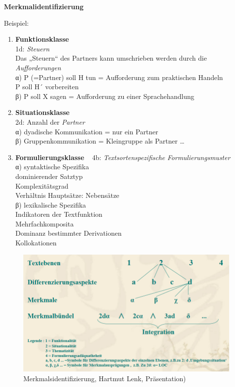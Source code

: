 \documentclass[
  letterpaper,
]{scrbook}
\begin{document}
\textbf{Merkmalidentifizierung}

Beispiel:\\

\begin{enumerate}
\def\labelenumi{\arabic{enumi})}
\item
  \textbf{Funktionsklasse}\\
  1d: \emph{Steuern}\\
  Das „Steuern`` des Partners kann umschrieben werden durch die
  \emph{Aufforderungen}\\
  α) P (=Partner) soll H tun = Aufforderung zum praktischen Handeln\\
  P soll H´ vorbereiten\\
  β) P soll X sagen = Aufforderung zu einer Sprachehandlung\\
\item
  \textbf{Situationsklasse}\\
  2d: Anzahl der \emph{Partner}\\
  α) dyadische Kommunikation = nur ein Partner\\
  β) Gruppenkommunikation = Kleingruppe als Partner \ldots{}\\
\item
  \textbf{Formulierungsklasse} ~ 4b: \emph{Textsortenspezifische
  Formulierungsmuster}\\
  α) syntaktische Spezifika\\
  dominierender Satztyp\\
  Komplexitätsgrad\\
  Verhältnis Hauptsätze: Nebensätze\\
  β) lexikalische Spezifika\\
  Indikatoren der Textfunktion\\
  Mehrfachkomposita\\
  Dominanz bestimmter Derivationen\\
  Kollokationen ~
\end{enumerate}

\begin{figure}

{\centering \includegraphics[width=1\textwidth,height=\textheight]{./pictures/texterkmalidentifizierung.png}

}

\caption{Merkmalsidentifizierung, Hartmut Lenk, Präsentation)}

\end{figure}
\end{document}
